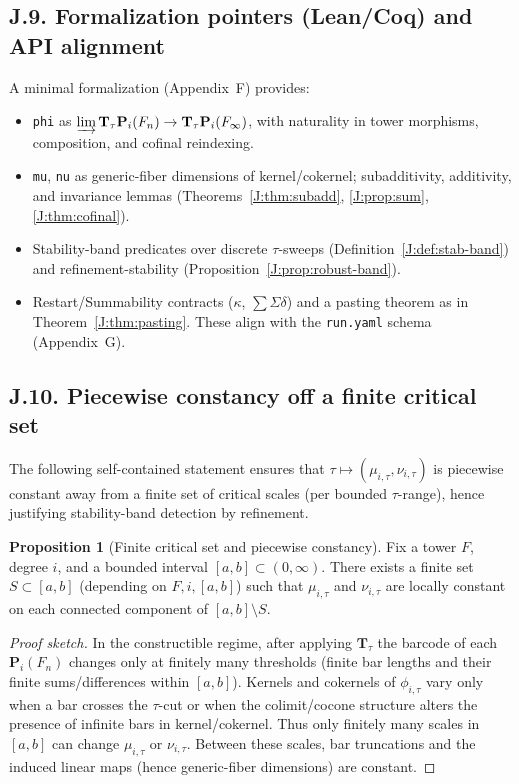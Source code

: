 \documentclass[11pt]{article}
\numberwithin{equation}{section}
\theoremstyle{plain}
\theoremstyle{definition}
\theoremstyle{remark}
\theoremstyle{plain}
\theoremstyle{definition}
\numberwithin{equation}{section}
\newtheorem{proposition}[theorem]{Proposition}
\theoremstyle{definition}
\numberwithin{equation}{section}
\theoremstyle{plain}
\theoremstyle{definition}
\theoremstyle{remark}
\begin{document}
\subsection*{J.9. Formalization pointers (Lean/Coq) and API alignment}
A minimal formalization (Appendix~F) provides:
\begin{itemize}\itemsep0.25em
  \item \texttt{phi} as \(\varinjlim \mathbf{T}_\tau\mathbf{P}_i(F_n)\to \mathbf{T}_\tau\mathbf{P}_i(F_\infty)\), with naturality in tower morphisms, composition, and cofinal reindexing.
  \item \texttt{mu}, \texttt{nu} as generic-fiber dimensions of kernel/cokernel; subadditivity, additivity, and invariance lemmas (Theorems~\ref{J:thm:subadd}, \ref{J:prop:sum}, \ref{J:thm:cofinal}).
  \item Stability-band predicates over discrete \(\tau\)-sweeps (Definition~\ref{J:def:stab-band}) and refinement-stability (Proposition~\ref{J:prop:robust-band}).
  \item Restart/Summability contracts (\(\kappa\), \(\sum\Sigma\delta\)) and a pasting theorem as in Theorem~\ref{J:thm:pasting}. These align with the \texttt{run.yaml} schema (Appendix~G).
\end{itemize}

\subsection*{J.10. Piecewise constancy off a finite critical set}
The following self-contained statement ensures that \(\tau\mapsto(\mu_{i,\tau},\nu_{i,\tau})\) is piecewise constant away from a finite set of critical scales (per bounded \(\tau\)-range), hence justifying stability-band detection by refinement.

\begin{proposition}[Finite critical set and piecewise constancy]\label{J:prop:piecewise}
Fix a tower \(F\), degree \(i\), and a bounded interval \([a,b]\subset(0,\infty)\).
There exists a finite set \(S\subset[a,b]\) (depending on \(F,i,[a,b]\)) such that \(\mu_{i,\tau}\) and \(\nu_{i,\tau}\) are locally constant on each connected component of \([a,b]\setminus S\).
\end{proposition}

\begin{proof}[Proof sketch]
In the constructible regime, after applying \(\mathbf{T}_\tau\) the barcode of each \(\mathbf{P}_i(F_n)\) changes only at finitely many thresholds (finite bar lengths and their finite sums/differences within \([a,b]\)). Kernels and cokernels of \(\phi_{i,\tau}\) vary only when a bar crosses the \(\tau\)-cut or when the colimit/cocone structure alters the presence of infinite bars in kernel/cokernel. Thus only finitely many scales in \([a,b]\) can change \(\mu_{i,\tau}\) or \(\nu_{i,\tau}\). Between these scales, bar truncations and the induced linear maps (hence generic-fiber dimensions) are constant.
\end{proof}
\end{document}
